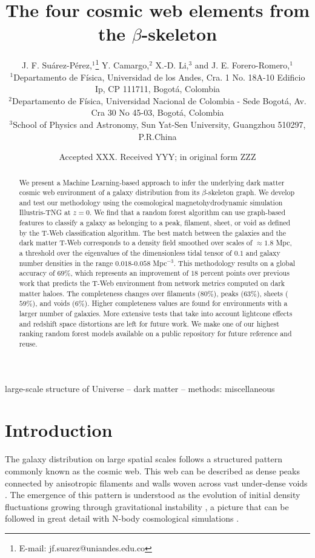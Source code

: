 \documentclass[usenatbib]{mnras}
\title[Cosmic web elements from the $\beta$-skeleton]{The four cosmic web elements from the $\beta$-skeleton}
\author[J. F. Su\'arez-P\'erez et al.]{
J. F. Su\'arez-P\'erez,$^{1}$\thanks{E-mail: jf.suarez@uniandes.edu.co}
Y. Camargo,$^{2}$ 
X.-D. Li,$^{3}$
and J. E. Forero-Romero,$^{1}$
\\
$^{1}$Departamento de F\'isica, Universidad de los Andes, Cra. 1
No. 18A-10 Edificio Ip, CP 111711, Bogot\'a, Colombia\\ 
$^{2}$Departamento de F\'isica, Universidad Nacional de Colombia -
Sede Bogot\'a, Av. Cra 30 No 45-03, Bogot\'a, Colombia\\ 
$^{3}$School of Physics and Astronomy, Sun Yat-Sen University,
Guangzhou 510297, P.R.China\\ 
}
\date{Accepted XXX. Received YYY; in original form ZZZ}
\begin{document}
\label{firstpage}
\pagerange{\pageref{firstpage}--\pageref{lastpage}}
\maketitle

\begin{abstract}
We present a Machine Learning-based approach to infer the underlying dark matter cosmic web environment of a galaxy distribution from its $\beta$-skeleton graph.
We develop and test our methodology using the cosmological magnetohydrodynamic simulation Illustris-TNG at $z=0$.
We find that a random forest algorithm can use graph-based features to classify a galaxy as belonging to a peak, filament, sheet, or void as defined by the T-Web classification algorithm.
The best match between the galaxies and the dark matter T-Web corresponds to a density field smoothed over scales of $\approx 1.8$ Mpc, a threshold over the eigenvalues of the dimensionless tidal tensor of $0.1$
and galaxy number densities in the range $0.018$-$0.058$ Mpc$^{-3}$.
This methodology results on a global accuracy of $69\%$, which represents an improvement of $18$ percent points over previous work that predicts the T-Web environment from network metrics computed on dark matter haloes.
The completeness changes over filaments ($80\%$), peaks ($63\%$), sheets ($59\%$), and voids ($6\%$).
Higher completeness values are found for environments with a larger number of galaxies.
More extensive tests that take into account lightcone effects and redshift space distortions are left for future work.
We make one of our highest ranking random forest models available on a public repository for future reference and reuse.
\end{abstract}

\begin{keywords}
large-scale structure of Universe -- dark matter -- methods: miscellaneous
\end{keywords}


\section{Introduction}
The galaxy distribution on large spatial scales follows a structured 
pattern commonly known as the cosmic web. 
This web can be described as dense peaks connected by anisotropic
filaments and walls woven across vast under-dense voids 
\citep{Bond1996}.  
The emergence of this pattern is understood as the evolution of
initial density fluctuations growing through gravitational instability
\citep{ZelDovich1970,White1987}, a picture that can be followed in
great detail with N-body cosmological simulations
\citep{Schmalzing1999,Vogelsberger2014}.     
\end{document}
